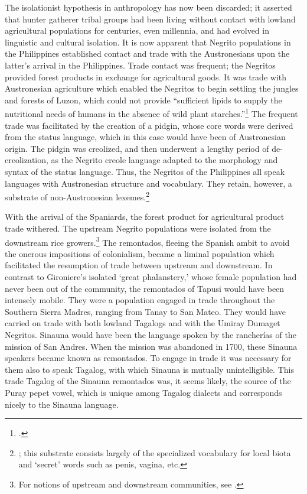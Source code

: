 The isolationist hypothesis in anthropology has now been discarded; it asserted that hunter gatherer tribal groups had been living without contact with lowland agricultural populations for centuries, even millennia, and had evolved in linguistic and cultural isolation. It is now apparent that Negrito populations in the Philippines established contact and trade with the Austronesians upon the latter's arrival in the Philippines. Trade contact was frequent; the Negritos provided forest products in exchange for agricultural goods. It was trade with Austronesian agriculture which enabled the Negritos to begin settling the jungles and forests of Luzon, which could not provide \enquote{sufficient lipids to supply the nutritional needs of humans in the absence of wild plant starches.}\footcite[47]{Headland1989} The frequent trade was facilitated by the creation of a pidgin, whose core words were derived from the status language, which in this case would have been of Austronesian origin. The pidgin was creolized, and then underwent a lengthy period of de-creolization, as the Negrito creole language adapted to the morphology and syntax of the status language. Thus, the Negritos of the Philippines all speak languages with Austronesian structure and vocabulary. They retain, however, a substrate of non-Austronesian lexemes.\footnote{\cite{Reid1994}; this substrate consists largely of the specialized vocabulary for local biota and ‘secret’ words such as penis, vagina, etc.}

With the arrival of the Spaniards, the forest product for agricultural product trade withered. The upstream Negrito populations were isolated from the downstream rice growers.\footnote{For notions of upstream and downstream communities, see \cite{Bronson1977}.} The remontados, fleeing the Spanish ambit to avoid the onerous impositions of colonialism, became a liminal population which facilitated the resumption of trade between upstream and downstream. In contrast to Gironiere's isolated \enquote*{great phalanstery,} whose female population had never been out of the community, the remontados of Tapusi would have been intensely mobile. They were a population engaged in trade throughout the Southern Sierra Madres, ranging from Tanay to San Mateo. They would have carried on trade with both lowland Tagalogs and with the Umiray Dumaget Negritos. Sinauna would have been the language spoken by the rancher\'ias of the mission of San Andres. When the mission was abandoned in 1700, these Sinauna speakers became known as remontados. To engage in trade it was necessary for them also to speak Tagalog, with which Sinauna is mutually unintelligible. This trade Tagalog of the Sinauna remontados was, it seems likely, the source of the Puray pepet vowel, which is unique among Tagalog dialects and corresponds nicely to the Sinauna language.

